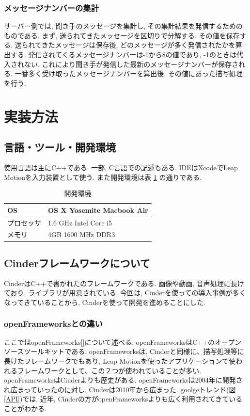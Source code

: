 \documentclass{funthesis}
\begin{document}
\subsubsection{メッセージナンバーの集計}
サーバー側では, 聞き手のメッセージを集計し,  その集計結果を発信するためのものである.
まず, 送られてきたメッセージを区切りで分解する. その値を保存する.
送られてきたメッセージは保存後, どのメッセージが多く発信されたかを算出する. 発信されてくるメッセージナンバーは-1から8の値であり, -1のときは代入されない. これにより聞き手が発信した最新のメッセージナンバーが保存される. 一番多く受け取ったメッセージナンバーを算出後, その値にあった描写処理を行う.  

\section{実装方法}

\subsection{言語・ツール・開発環境}
使用言語は主にC++である. 一部, C言語での記述もある. IDEはXcodeでLeap Motionを入力装置として使う. また開発環境は表 \ref{env} の通りである. 

\begin{table}[H]
\begin{center}
\caption{開発環境}
  \begin{tabular}{ll}
  
   \hline
OS & OS X  Yosemite Macbook Air \\ 
  \hline
プロセッサ & 1.6 GHz Intel Core i5\\ 
  \hline
メモリ & 4GB 1600 MHz DDR3\\ 
  \hline
  \end{tabular}
  \label{env}
  \end{center}
\end{table}


\subsection{Cinderフレームワークについて}
CinderはC++で書かれたのフレームワークである. 画像や動画, 音声処理に長けており, ライブラリが用意されている. 今回は, Cinderを使っての導入事例が多くなってきていることから, Cinderを使って開発を進めることにした. 



\subsubsection{openFrameworksとの違い}
ここではopenFrameworks[]について述べる. openFrameworksはC++のオープンソースツールキットである. openFrameworksは, Cinderと同様に、描写処理等に長けたフレームワークでもあり, Leap Motionを使ったアプリケーションで使われるフレームワークとして、この２つが使われていることが多い. 
openFrameworksはCinderよりも歴史がある. openFrameworksは2004年に開発され広まっていったのに対し. Cinderは2010年から広まった. goolgeトレンド(図\ref{API})では, 近年, Cinderの方がopenFrameworksよりも広く利用されてきていることがわかる. 
\end{document}
